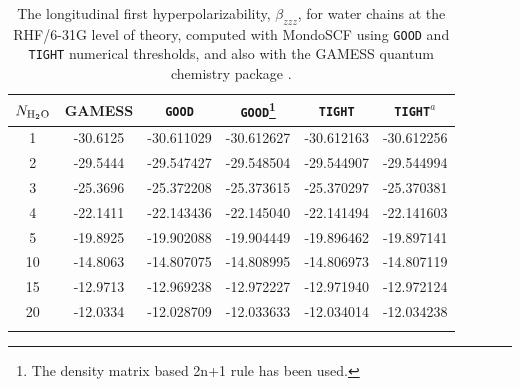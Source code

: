 \documentclass[prl,twocolumn,showpacs,twocolumngrid,superbib]{revtex4}
\begin{document}
{\begin{table}[h]
  \centering
  \caption{\protect
    The longitudinal first hyperpolarizability, $\beta_{zzz}$,
    for water chains at the RHF/6-31G level of theory, computed with 
    {\sc MondoSCF} using {\tt GOOD} and {\tt TIGHT} numerical thresholds, 
    and also with the {\sc GAMESS} quantum chemistry package \cite{gamess}.
  }\label{tab:Beta_1D_Values}
  \begin{tabular}{cccccc}
    \toprule
    $N_{\rm H_2 O}$ &\multicolumn{1}{c}{{\sc GAMESS}}
    &\multicolumn{1}{c}{{\tt GOOD}}
    &\multicolumn{1}{c}{{\tt GOOD}\footnote[1]{The density matrix based 2n+1 rule has been used.}}
    &\multicolumn{1}{c}{{\tt TIGHT}}
    &\multicolumn{1}{c}{{\tt TIGHT}$^a$} \\
    \hline
     1 & -30.6125 & -30.611029 & -30.612627 & -30.612163 & -30.612256 \\
     2 & -29.5444 & -29.547427 & -29.548504 & -29.544907 & -29.544994 \\
     3 & -25.3696 & -25.372208 & -25.373615 & -25.370297 & -25.370381 \\
     4 & -22.1411 & -22.143436 & -22.145040 & -22.141494 & -22.141603 \\
     5 & -19.8925 & -19.902088 & -19.904449 & -19.896462 & -19.897141 \\
    10 & -14.8063 & -14.807075 & -14.808995 & -14.806973 & -14.807119 \\
    15 & -12.9713 & -12.969238 & -12.972227 & -12.971940 & -12.972124 \\
    20 & -12.0334 & -12.028709 & -12.033633 & -12.034014 & -12.034238 \\
    \botrule
  \end{tabular}
\end{table}

}
\end{document}
